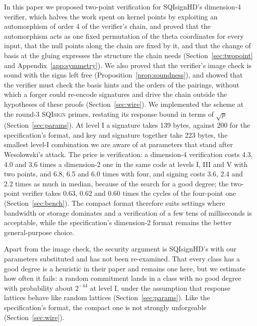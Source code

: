 \documentclass[version=preprint]{iacrcc}
\newcommand{\SQIsign}{SQI{\textsc{sign}}}
\begin{document}
    In this paper we proposed two-point verification for SQIsignHD's
    dimension-4 verifier, which halves the work spent on kernel points by
    exploiting an automorphism of order 4 of the verifier's chain, and proved
    that the automorphism acts as one fixed permutation of the theta
    coordinates for every input, that the null points along the chain are
    fixed by it, and that the change of basis at the gluing expresses the
    structure the chain needs (Section~\ref{sec:twopoint} and
    Appendix~\ref{app:symmetry}). We also proved that the verifier's image
    check is sound with the signs left free (Proposition~\ref{prop:soundness}),
    and showed that the verifier must check the basis hints and the orders of
    the pairings, without which a forger could re-encode signatures and drive
    the chain outside the hypotheses of these proofs (Section~\ref{sec:wire}).
    We implemented the scheme at the round-3
    {\SQIsign} primes, restating its response bound in terms of $\sqrt{p}$
    (Section~\ref{sec:params}). At level I a signature takes 139 bytes, against 200 for the
    specification's format, and key and signature together take 223 bytes, the
    smallest level-I
    combination we are aware of at parameters that stand after
    Wesolowski's attack. The price is verification: a dimension-4
    verification costs 4.3, 4.0 and 3.6 times a dimension-2 one in
    the same code at levels I, III and V with two points, and 6.8, 6.5 and
    6.0 times with four, and
    signing costs 3.6, 2.4 and 2.2 times as much in median, because of the search
    for a good degree;
    the two-point verifier takes 0.63, 0.62 and 0.60 times the cycles of
    the four-point one (Section~\ref{sec:bench}). The compact format therefore suits settings
    where bandwidth or storage dominates and a verification of a few tens of
    milliseconds is acceptable, while the specification's dimension-2 format
    remains the better general-purpose choice.

    Apart from the image check, the security argument is SQIsignHD's with our
    parameters substituted and has not been re-examined. That every class
    has a good degree is a heuristic in their paper and remains one here, but
    we estimate how often it fails: a random commitment lands in a class with
    no good degree with probability about $2^{-44}$ at level I, under the
    assumption that response lattices behave like random lattices
    (Section~\ref{sec:params}). Like the specification's
    format, the compact one is not strongly unforgeable
    (Section~\ref{sec:wire}).
\end{document}
